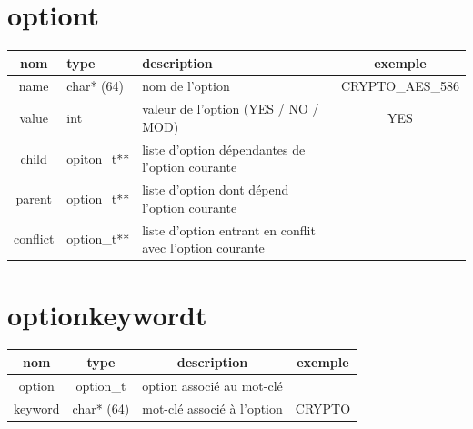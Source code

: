 \documentclass[16pts]{report}
\begin{document}
\section{option\textunderscore t}
\label{sec:option t}

\begin{tabularx}{\textwidth}{|c|X|X|c|}
\hline
nom & type & description & exemple \\
\hline
\hline
name & char* (64) & nom de l'option & CRYPTO\_AES\_586 \\
\hline
value & int & valeur de l'option (YES / NO / MOD) & YES \\
\hline
child & opiton\_t** & liste d'option dépendantes de l'option courante & \\
\hline
parent & option\_t** & liste d'option dont dépend l'option courante & \\
\hline
conflict & option\_t** & liste d'option entrant en conflit avec l'option courante &   \\
\hline
\end{tabularx}

\section{option\textunderscore keyword\textunderscore t}
\label{sec:option keyword t}

\begin{tabular}{|c|c|c|c|}
\hline
nom & type & description & exemple \\
\hline
\hline
option & option\_t & option associé au mot-clé & \\
\hline
keyword & char* (64) & mot-clé associé à l'option & CRYPTO \\
\hline
\end{tabular}
\end{document}
